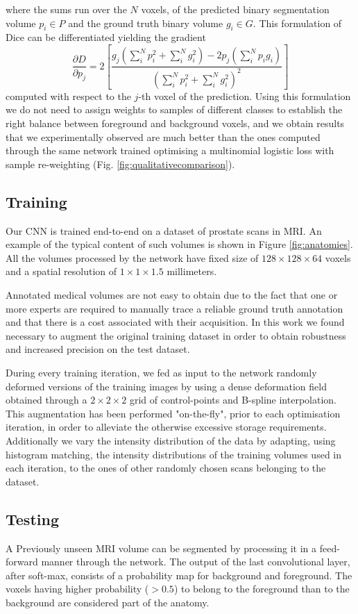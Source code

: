 where the sums run over the $N$ voxels, of the predicted binary segmentation volume $p_i\in{P}$ and the ground truth binary volume $g_i\in{G}$. This formulation of Dice can be differentiated yielding the gradient  
\[
\frac{\partial D}{\partial p_{j}}=2\left[\frac{g_{j}\left(\sum_{i}^{N}p_{i}^{2}+\sum_{i}^{N}g_{i}^{2}\right)-2p_{j}\left(\sum_{i}^{N}p_{i}g_{i}\right)}{\left(\sum_{i}^{N}p_{i}^{2}+\sum_{i}^{N}g_{i}^{2}\right)^{2}}\right]
\]
computed with respect to the $j$-th voxel of the prediction. Using this formulation we do not need to assign weights to samples of different classes to establish the right balance between foreground and background voxels, and we obtain results that we experimentally observed are much better than the ones computed through the same network trained optimising a multinomial logistic loss with sample re-weighting (Fig. \ref{fig:qualitativecomparison}). 

\subsection{Training}
Our CNN is trained end-to-end on a dataset of prostate scans in MRI. An example of the typical content of such volumes is shown in Figure \ref{fig:anatomies}. All the volumes processed by the network have fixed size of $128\times128\times64$ voxels and a spatial resolution of $1\times1\times1.5$ millimeters.

Annotated medical volumes are not easy to obtain due to the fact that one or more experts are required to manually trace a reliable ground truth annotation and that there is a cost associated with their acquisition. In this work we found necessary to augment the original training dataset in order to obtain robustness and increased precision on the test dataset. 

During every training iteration, we fed as input to the network randomly deformed versions of the training images by using a dense deformation field obtained through a $2\times2\times2$ grid of control-points and B-spline interpolation. This augmentation has been performed "on-the-fly", prior to each optimisation iteration, in order to alleviate the otherwise excessive storage requirements. Additionally we vary the intensity distribution of the data by adapting, using histogram matching, the intensity distributions of the training volumes used in each iteration, to the ones of other randomly chosen scans belonging to the dataset.

\subsection{Testing}
A Previously unseen MRI volume can be segmented by processing it in a feed-forward manner through the network. The output of the last convolutional layer, after soft-max, consists of a probability map for background and foreground. The voxels having higher probability ($>0.5$) to belong to the foreground than to the background are considered part of the anatomy.
